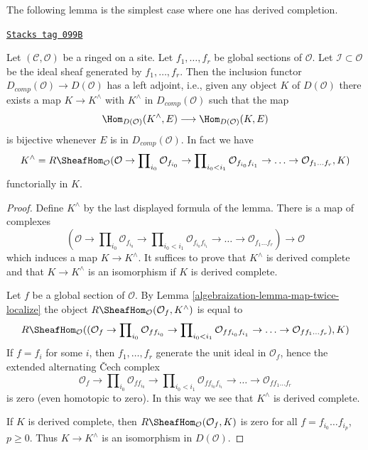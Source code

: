 The following lemma is the simplest case where one has derived completion.

\begin{lemma}
\label{algebraization-lemma-derived-completion}
\href{https://stacks.math.columbia.edu/tag/099B}{\texttt{Stacks tag 099B}}

Let $(\mathcal{C}, \mathcal{O})$ be a ringed on a site. Let $f_1, \ldots, f_r$
be global sections of $\mathcal{O}$. Let $\mathcal{I} \subset \mathcal{O}$ be
the ideal sheaf generated by $f_1, \ldots, f_r$.
Then the inclusion functor $D_{comp}(\mathcal{O}) \to D(\mathcal{O})$
has a left adjoint, i.e., given any object $K$ of $D(\mathcal{O})$
there exists a map $K \to K^\wedge$ with $K^\wedge$ in $D_{comp}(\mathcal{O})$
such that the map
$$
\Hom_{D(\mathcal{O})}(K^\wedge, E) \longrightarrow \Hom_{D(\mathcal{O})}(K, E)
$$
is bijective whenever $E$ is in $D_{comp}(\mathcal{O})$. In fact
we have
$$
K^\wedge =
R\SheafHom_\mathcal{O}
(\mathcal{O} \to \prod\nolimits_{i_0} \mathcal{O}_{f_{i_0}} \to
\prod\nolimits_{i_0 < i_1} \mathcal{O}_{f_{i_0}f_{i_1}} \to
\ldots \to \mathcal{O}_{f_1\ldots f_r}, K)
$$
functorially in $K$.
\end{lemma}

\begin{proof}

Define $K^\wedge$ by the last displayed formula of the lemma.
There is a map of complexes
$$
(\mathcal{O} \to \prod\nolimits_{i_0} \mathcal{O}_{f_{i_0}} \to
\prod\nolimits_{i_0 < i_1} \mathcal{O}_{f_{i_0}f_{i_1}} \to
\ldots \to \mathcal{O}_{f_1\ldots f_r}) \longrightarrow \mathcal{O}
$$
which induces a map $K \to K^\wedge$. It suffices to prove that
$K^\wedge$ is derived complete and that $K \to K^\wedge$ is an
isomorphism if $K$ is derived complete.

\medskip\noindent
Let $f$ be a global section of $\mathcal{O}$.
By Lemma \ref{algebraization-lemma-map-twice-localize} the object
$R\SheafHom_\mathcal{O}(\mathcal{O}_f, K^\wedge)$
is equal to
$$
R\SheafHom_\mathcal{O}(
(\mathcal{O}_f \to \prod\nolimits_{i_0} \mathcal{O}_{ff_{i_0}} \to
\prod\nolimits_{i_0 < i_1} \mathcal{O}_{ff_{i_0}f_{i_1}} \to
\ldots \to \mathcal{O}_{ff_1\ldots f_r}), K)
$$
If $f = f_i$ for some $i$, then $f_1, \ldots, f_r$ generate the
unit ideal in $\mathcal{O}_f$, hence the extended alternating
{\v C}ech complex
$$
\mathcal{O}_f \to \prod\nolimits_{i_0} \mathcal{O}_{ff_{i_0}} \to
\prod\nolimits_{i_0 < i_1} \mathcal{O}_{ff_{i_0}f_{i_1}} \to
\ldots \to \mathcal{O}_{ff_1\ldots f_r}
$$
is zero (even homotopic to zero). In this way we see that $K^\wedge$
is derived complete.

\medskip\noindent
If $K$ is derived complete, then $R\SheafHom_\mathcal{O}(\mathcal{O}_f, K)$
is zero for all $f = f_{i_0} \ldots f_{i_p}$, $p \geq 0$. Thus
$K \to K^\wedge$ is an isomorphism in $D(\mathcal{O})$.
\end{proof}

